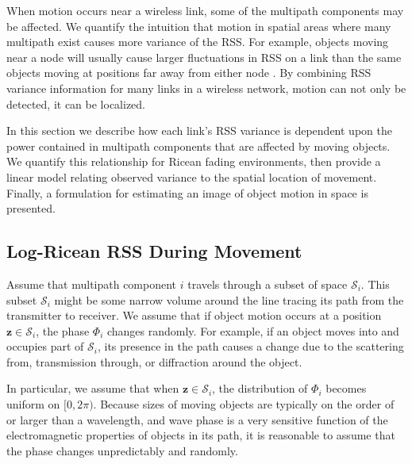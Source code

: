 \documentclass[journal]{IEEEtran}
\newcommand{\mbz}[0]{\mathbf{z}}
\begin{document}
When motion occurs near a wireless link, some of the multipath components may be affected. We quantify the intuition that motion in spatial areas where many multipath exist causes more variance of the RSS. For example, objects moving near a node will usually cause larger fluctuations in RSS on a link than the same objects moving at positions far away from either node \cite{Bultitude87}. By combining RSS variance information for many links in a wireless network, motion can not only be detected, it can be localized.

In this section we describe how each link's RSS variance is dependent upon the power contained in multipath components that are affected by moving objects. We quantify this relationship for Ricean fading environments, then provide a linear model relating observed variance to the spatial location of movement.  Finally, a formulation for estimating an image of object motion in space is presented.

\subsection{Log-Ricean RSS During Movement}

Assume that multipath component $i$ travels through a subset of space $\mathcal{S}_i$.  This subset $\mathcal{S}_i$ might be some narrow volume around the line tracing its path from the transmitter to receiver.   We assume that if object motion occurs at a position $\mbz \in \mathcal{S}_i$, the phase $\Phi_i$ changes randomly.  For example, if an object moves into and occupies part of $\mathcal{S}_i$, its presence in the path causes a change due to the scattering from, transmission through, or diffraction around the object.

In particular, we assume that when $\mbz \in \mathcal{S}_i$, the distribution of $\Phi_i$ becomes uniform on $[0, 2\pi)$.  Because sizes of moving objects are typically on the order of or larger than a wavelength, and wave phase is a very sensitive function of the electromagnetic properties of objects in its path, it is reasonable to assume that the phase changes unpredictably and randomly.
\end{document}
